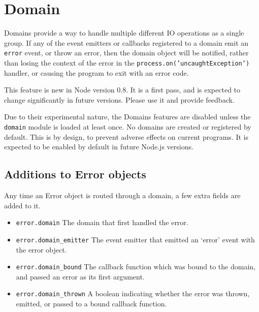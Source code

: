 \section{Domain}

\begin{Shaded}
\begin{Highlighting}[]
\NormalTok{: } 
\end{Highlighting}
\end{Shaded}

Domains provide a way to handle multiple different IO operations as a
single group. If any of the event emitters or callbacks registered to a
domain emit an \texttt{error} event, or throw an error, then the domain
object will be notified, rather than losing the context of the error in
the \texttt{process.on('uncaughtException')} handler, or causing the
program to exit with an error code.

This feature is new in Node version 0.8. It is a first pass, and is
expected to change significantly in future versions. Please use it and
provide feedback.

Due to their experimental nature, the Domains features are disabled
unless the \texttt{domain} module is loaded at least once. No domains
are created or registered by default. This is by design, to prevent
adverse effects on current programs. It is expected to be enabled by
default in future Node.js versions.

\subsection{Additions to Error objects}

Any time an Error object is routed through a domain, a few extra fields
are added to it.

\begin{itemize}
\item
  \texttt{error.domain} The domain that first handled the error.
\item
  \texttt{error.domain\_emitter} The event emitter that emitted an
  `error' event with the error object.
\item
  \texttt{error.domain\_bound} The callback function which was bound to
  the domain, and passed an error as its first argument.
\item
  \texttt{error.domain\_thrown} A boolean indicating whether the error
  was thrown, emitted, or passed to a bound callback function.
\end{itemize}

